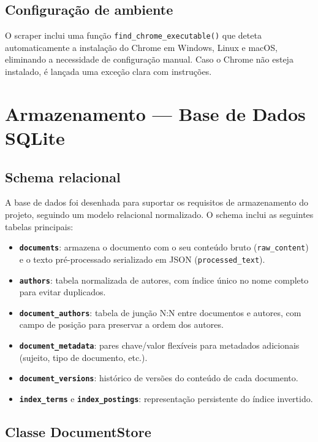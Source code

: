 \documentclass[12pt,a4paper]{article}
\begin{document}
\subsection{Configuração de ambiente}

O scraper inclui uma função \texttt{find\_chrome\_executable()} que deteta automaticamente a instalação do Chrome em Windows, Linux e macOS, eliminando a necessidade de configuração manual. Caso o Chrome não esteja instalado, é lançada uma exceção clara com instruções.

\section{Armazenamento --- Base de Dados SQLite}

\subsection{Schema relacional}

A base de dados foi desenhada para suportar os requisitos de armazenamento do projeto, seguindo um modelo relacional normalizado. O schema inclui as seguintes tabelas principais:

\begin{itemize}
    \item \textbf{\texttt{documents}}: armazena o documento com o seu conteúdo bruto (\texttt{raw\_content}) e o texto pré-processado serializado em JSON (\texttt{processed\_text}).
    \item \textbf{\texttt{authors}}: tabela normalizada de autores, com índice único no nome completo para evitar duplicados.
    \item \textbf{\texttt{document\_authors}}: tabela de junção N:N entre documentos e autores, com campo de posição para preservar a ordem dos autores.
    \item \textbf{\texttt{document\_metadata}}: pares chave/valor flexíveis para metadados adicionais (sujeito, tipo de documento, etc.).
    \item \textbf{\texttt{document\_versions}}: histórico de versões do conteúdo de cada documento.
    \item \textbf{\texttt{index\_terms}} e \textbf{\texttt{index\_postings}}: representação persistente do índice invertido.
\end{itemize}

\subsection{Classe DocumentStore}
\end{document}
